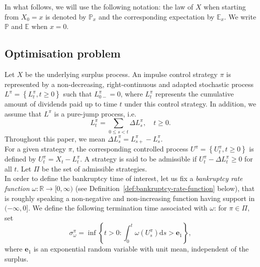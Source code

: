 \documentclass[11pt,reqno]{amsart}
\newcommand{\p}{\mathbb{P}}
\newcommand{\e}{\mathbb{E}}
\newcommand{\reals}{\mathbb{R}}
\newcommand{\ruintime}{\sigma^\pi_\omega}
\renewcommand{\leq}{\leqslant}
\renewcommand{\geq}{\geqslant}
\begin{document}
In what follows, we will use the following notation: the law of $X$ when starting from $X_0 = x$ is denoted by $\p_x$ and the corresponding expectation by $\e_x$. We write $\p$ and $\e$ when $x=0$.


\subsection{Optimisation problem}\label{sect:optimisation-problem}

Let $X$ be the underlying surplus process. An impulse control strategy $\pi$ is represented by a non-decreasing, right-continuous and adapted stochastic process $L^\pi = \left\lbrace L^\pi_t , t \geq 0 \right\rbrace$ such that $L^\pi_{0-} = 0$, where $L^\pi_t$ represents the cumulative amount of dividends paid up to time $t$ under this control strategy. In addition, we assume that $L^\pi$ is a pure-jump process, i.e.
\[
L^\pi_t = \sum_{0 \leq s < t} \Delta L^\pi_s, \quad t \geq 0.
\]
Throughout this paper, we mean $\Delta L^\pi_s = L^\pi_{s+} - L^\pi_s$.\\
For a given strategy $\pi$, the corresponding controlled process $U^\pi = \left\lbrace U^\pi_t , t \geq 0 \right\rbrace$ is defined by $U^\pi_t = X_t - L^\pi_t$. A strategy is said to be admissible if $U^\pi_t - \Delta L^\pi_t \geq 0$ for all $t$. Let $\Pi$ be the set of admissible strategies.\\
In order to define the bankruptcy time of interest, let us fix a \textit{bankruptcy rate function} $\omega \colon \reals \to [0,\infty)$ (see Definition~\ref{def:bankruptcy-rate-function} below), that is roughly speaking a non-negative and non-increasing function having support in $(-\infty,0]$. We define the following termination time associated with $\omega$: for $\pi \in \Pi$, set
\begin{equation}\label{omega-ruin}
\ruintime = \inf \left\lbrace t>0 \colon \int_0^t \omega(U^\pi_s) \mathrm{d}s > \mathbf{e}_1 \right\rbrace ,
\end{equation}
where $\mathbf{e}_1$ is an exponential random variable with unit mean, independent of the surplus.
\end{document}
